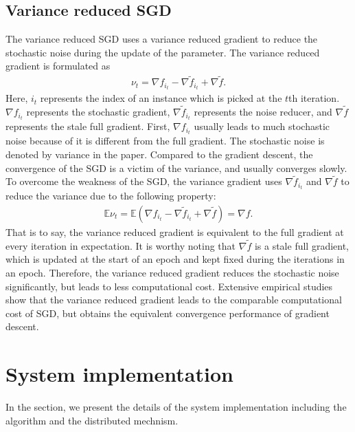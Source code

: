 \documentclass[preprint,review,11pt,a4paper]{elsarticle}
\begin{document}
\subsection{Variance reduced SGD}
The variance reduced SGD uses a variance reduced gradient to reduce the stochastic noise during the update of the parameter. The variance reduced gradient is formulated as 
\begin{equation}
\label{equa_vr_gradient}
\begin{array}{ll}
\nu_t = \nabla f_{i_t} - \nabla \tilde{f}_{i_t} + \nabla \tilde{f}.
\end{array}
\end{equation} Here, $i_t$ represents the index of an instance which is picked at the $t$th iteration. $\nabla f_{i_t}$ represents the stochastic gradient, $\nabla \tilde{f}_{i_t}$ represents the noise reducer, and $\nabla \tilde{f}$ represents  the stale full gradient. First, $\nabla f_{i_t}$ usually leads to much stochastic noise because of it is different from the full gradient. The stochastic noise is denoted by variance in the paper. Compared to the gradient descent, the convergence of the SGD is a  victim of the variance, and usually converges slowly. To overcome the weakness of the SGD, the variance gradient uses $\nabla \tilde{f}_{i_t}$ and  $\nabla \tilde{f}$ to reduce the variance due to the following property:
\begin{equation}
\label{equa_vr_gradient}
\begin{array}{ll}
\mathbb{E}\nu_t = \mathbb{E}(\nabla f_{i_t} - \nabla \tilde{f}_{i_t} + \nabla \tilde{f}) = \nabla f.
\end{array}
\end{equation} That is to say, the variance reduced gradient is equivalent to the full gradient at every iteration in expectation. It is worthy noting that $\nabla \tilde{f}$ is a stale full gradient, which is updated at the start of an epoch and kept fixed during the iterations in an epoch.  Therefore, the variance reduced gradient reduces the stochastic noise significantly, but leads to less computational cost. Extensive empirical studies show that the variance reduced gradient leads to the comparable computational cost of SGD, but obtains the equivalent convergence performance of gradient descent.



\section{System implementation}
\label{implementation}
In the section, we present the details of the system implementation including the algorithm and the distributed mechnism.
\end{document}
